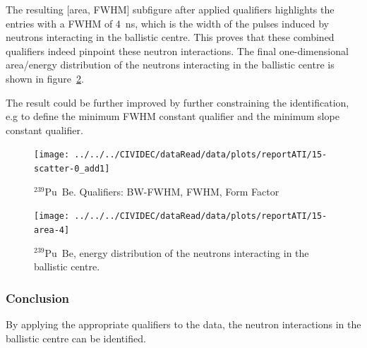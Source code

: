 The resulting [area, FWHM] subfigure after applied qualifiers highlights the entries with a FWHM of 4~ns, which is the width of the pulses induced by neutrons interacting in the ballistic centre. This proves that these combined qualifiers indeed pinpoint these neutron interactions. The final one-dimensional area/energy distribution of the neutrons interacting in the ballistic centre is shown in figure~\ref{fig:scatterpuarea}. 

The result could be further improved by further constraining the identification, e.g to define the minimum FWHM constant qualifier and the minimum slope constant qualifier.




\begin{figure}[]
\centering
\texttt{[image: ../../../CIVIDEC/dataRead/data/plots/reportATI/15-scatter-0\_add1]}
\caption{$^{239}$Pu~Be. Qualifiers: BW-FWHM, FWHM, Form Factor}
\label{fig:scatterpu}
\end{figure}

\begin{figure}[]
\centering
\texttt{[image: ../../../CIVIDEC/dataRead/data/plots/reportATI/15-area-4]}
\caption{$^{239}$Pu~Be, energy distribution of the neutrons interacting in the ballistic centre.}
\label{fig:scatterpuarea}
\end{figure}


\subsubsection{Conclusion}
By applying the appropriate qualifiers to the data, the neutron interactions in the ballistic centre can be identified.



